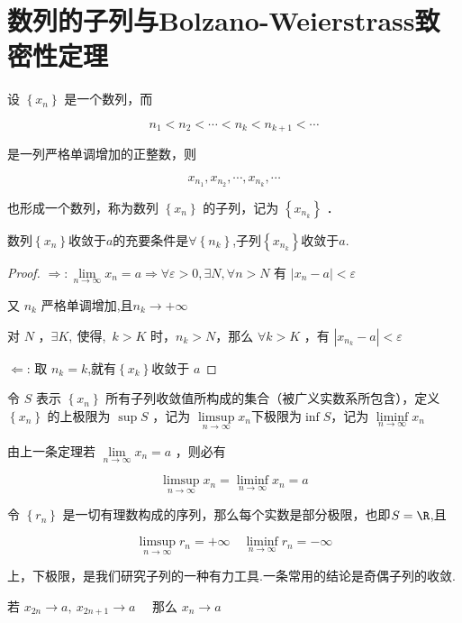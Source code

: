 \section{数列的子列与Bolzano-Weierstrass致密性定理}
\begin{definition}
	设 $\left\{x_n\right\}$ 是一个数列，而
	
	$$
	n_1<n_2<\cdots<n_k<n_{k+1}<\cdots
	$$
	
	
	是一列严格单调增加的正整数，则
	
	$$
	x_{n_1}, x_{n_2}, \cdots, x_{n_k}, \cdots
	$$
	
	
	也形成一个数列，称为数列 $\left\{x_n\right\}$ 的子列，记为 $\left\{x_{n_k}\right\}$ ．
\end{definition}
\begin{proposition}
	数列$\left\{x_n\right\}$收敛于$a$的充要条件是$\forall\left\{n_k\right\}$,子列$\left\{x_{n_k}\right\}$收敛于$a$.
\end{proposition}

\begin{proof}
	$\Rightarrow: \lim\limits_{n \rightarrow \infty} x_n=a \Rightarrow \forall \varepsilon>0, \exists N , \forall n>N$ 有 $|x_n-a|<\varepsilon$
	
	又 $n_{k}$ 严格单调增加,且$n_k\rightarrow+\infty$
	
	对 $N$ ，$\exists K,~$使得,~$k>K$ 时，$n_k>N$，那么
	$\forall k>K$ ，有 $\left|x_{n_k}-a\right|<\varepsilon$
	
	
	$\Leftarrow$: 取 $n_k=k$,就有$\left\{x_k\right\}$收敛于 $a$
\end{proof}
\begin{definition}
	令 $S$ 表示 $\left\{x_n\right\}$ 所有子列收敛值所构成的集合（被广义实数系所包含），定义 $\left\{x_n\right\}$ 的上极限为  $\sup S$ ，记为 $\limsup\limits _{n \rightarrow \infty} x_n$下极限为$\inf S$，记为 $\liminf\limits _{n \rightarrow \infty} x_n$
	
	由上一条定理若 $\lim\limits_{n \rightarrow \infty} x_n=a$ ，则必有
	
	$$
	\limsup\limits_{n \rightarrow \infty} x_n=\liminf\limits _{n \rightarrow \infty} x_n=a
	$$
\end{definition}
\begin{example}
	令 $\left\{r_n\right\}$ 是一切有理数构成的序列，那么每个实数是部分极限，也即$S=\R$,且 
	
	$$\limsup _{n \rightarrow \infty} r_n=+\infty \quad \liminf _{n \rightarrow \infty} r_n=-\infty$$
	
	
\end{example}
上，下极限，是我们研究子列的一种有力工具.一条常用的结论是奇偶子列的收敛.
\begin{proposition}\label{oddandeven}
	若 $x_{2 n} \rightarrow a, ~ x_{2 n+1} \rightarrow a \quad$ 那么 $x_n \rightarrow a$
\end{proposition}

